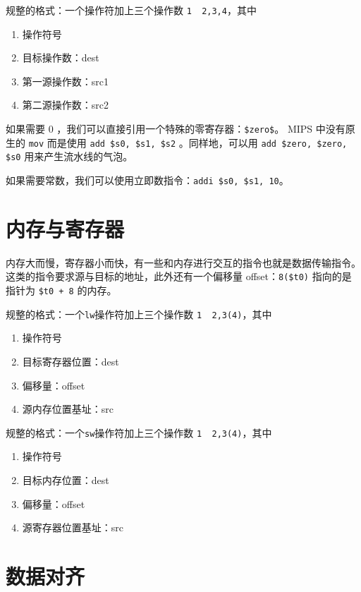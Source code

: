 \documentclass[cn,11pt,chinese,black,simple]{../elegantbook}
\begin{document}
规整的格式：一个操作符加上三个操作数 \lstinline{1  2,3,4}，其中

\begin{enumerate}
    \item 操作符号
    \item 目标操作数：dest
    \item 第一源操作数：src1
    \item 第二源操作数：src2
\end{enumerate}

如果需要 0 ，我们可以直接引用一个特殊的零寄存器：\lstinline{$zero$}。 MIPS 中没有原生的 \lstinline{mov} 而是使用 \lstinline{add $s0, $s1, $s2} 。同样地，可以用 \lstinline{add $zero, $zero, $s0} 用来产生流水线的气泡。

如果需要常数，我们可以使用立即数指令：\lstinline{addi $s0, $s1, 10}。

\section{内存与寄存器}

内存大而慢，寄存器小而快，有一些和内存进行交互的指令也就是数据传输指令。这类的指令要求源与目标的地址，此外还有一个偏移量 offset：\lstinline{8($t0)} 指向的是指针为 \lstinline{$t0 + 8} 的内存。


规整的格式：一个\lstinline{lw}操作符加上三个操作数 \lstinline{1  2,3(4)}，其中

\begin{enumerate}
    \item 操作符号
    \item 目标寄存器位置：dest
    \item 偏移量：offset
    \item 源内存位置基址：src
\end{enumerate}


规整的格式：一个\lstinline{sw}操作符加上三个操作数 \lstinline{1  2,3(4)}，其中

\begin{enumerate}
    \item 操作符号
    \item 目标内存位置：dest
    \item 偏移量：offset
    \item 源寄存器位置基址：src
\end{enumerate}

\section{数据对齐}
\end{document}
